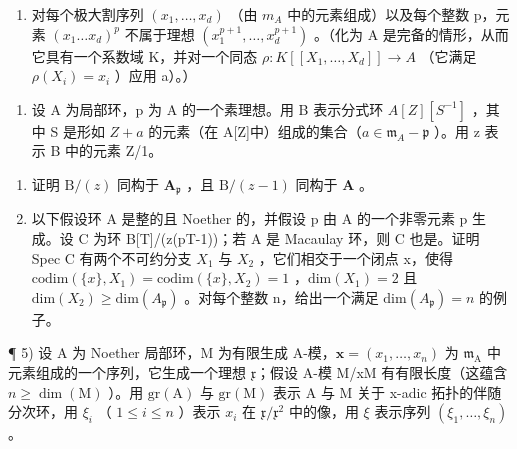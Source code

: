 \begin{enumerate}
\def\labelenumi{(\Roman{enumi})}
\setcounter{enumi}{899}
\tightlist
\item
  对每个极大割序列 \((x_{1},\ldots,x_{d})\) （由 \(m_{A}\) 中的元素组成）以及每个整数 p，元素 \((x_{1}\ldots x_{d})^{p}\) 不属于理想 \((x_{1}^{p+1},\ldots,x_{d}^{p+1})\) 。（化为 A 是完备的情形，从而它具有一个系数域 K，并对一个同态 \(\rho:K[[X_{1},\ldots,X_{d}]]\to A\) （它满足 \(\rho(X_{i})=x_{i}\) ）应用 a）。）
\end{enumerate}

\begin{enumerate}
\def\labelenumi{\arabic{enumi})}
\setcounter{enumi}{3}
\tightlist
\item
  设 A 为局部环，p 为 A 的一个素理想。用 B 表示分式环 \(A[Z][S^{-1}]\) ，其中 S 是形如 \(Z + a\) 的元素（在 A{[}Z{]}中）组成的集合（\(a \in \mathfrak{m}_{A} - \mathfrak{p}\) ）。用 z 表示 B 中的元素 Z/1。
\end{enumerate}

\begin{enumerate}
\def\labelenumi{\alph{enumi})}
\item
  证明 \(\mathrm{B} / (z)\) 同构于 \(\mathbf{A}_{\mathfrak{p}}\) ，且 \(\mathrm{B} / (z - 1)\) 同构于 \(\mathbf{A}\) 。
\item
  以下假设环 A 是整的且 Noether 的，并假设 p 由 A 的一个非零元素 p 生成。设 C 为环 B{[}T{]}/(z(pT-1))；若 A 是 Macaulay 环，则 C 也是。证明 Spec C 有两个不可约分支 \(X_{1}\) 与 \(X_{2}\) ，它们相交于一个闭点 x，使得 \(\text{codim}(\{x\}, X_{1}) = \text{codim}(\{x\}, X_{2}) = 1\) ，\(\text{dim}(X_{1}) = 2\) 且 \(\text{dim}(X_{2}) \geqslant \text{dim}(A_{\mathfrak{p}})\) 。对每个整数 n，给出一个满足 \(\text{dim}(A_{\mathfrak{p}}) = n\) 的例子。
\end{enumerate}

¶ 5) 设 A 为 Noether 局部环，M 为有限生成 A-模，\(\mathbf{x} = (x_{1},\ldots ,x_{n})\) 为 \(\mathfrak{m}_{\mathrm{A}}\) 中元素组成的一个序列，它生成一个理想 \(\mathfrak{x}\)；假设 A-模 M/xM 有有限长度（这蕴含 \(n\geqslant \dim (\mathrm{M})\) ）。用 \(\mathrm{gr(A)}\) 与 \(\mathrm{gr(M)}\) 表示 A 与 M 关于 x-adic 拓扑的伴随分次环，用 \(\xi_{i}\) （ \(1\leqslant i\leqslant n\) ）表示 \(x_{i}\) 在 \(\mathfrak{x} / \mathfrak{x}^{2}\) 中的像，用 \(\xi\) 表示序列 \((\xi_1,\dots ,\xi_n)\) 。

